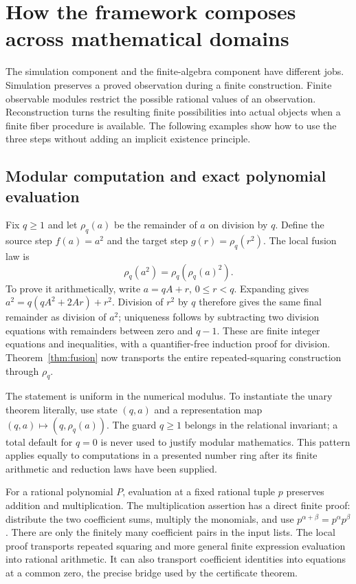 \section{How the framework composes across mathematical domains}
\label{sec:applications}

The simulation component and the finite-algebra component have different
jobs. Simulation preserves a proved observation during a finite
construction. Finite observable modules restrict the possible rational
values of an observation. Reconstruction turns the resulting finite
possibilities into actual objects when a finite fiber procedure is
available. The following examples show how to use the three steps
without adding an implicit existence principle.

\subsection{Modular computation and exact polynomial evaluation}

Fix $q\ge1$ and let $\rho_q(a)$ be the remainder of $a$ on division
by $q$. Define the source step $f(a)=a^2$ and the target step
$g(r)=\rho_q(r^2)$. The local fusion law is
\[
                  \rho_q(a^2)=\rho_q(\rho_q(a)^2).
\]
To prove it arithmetically, write $a=qA+r$, $0\le r<q$.
Expanding gives $a^2=q(qA^2+2Ar)+r^2$. Division of $r^2$ by
$q$ therefore gives the same final remainder as division of $a^2$;
uniqueness follows by subtracting two division equations with remainders
between zero and $q-1$. These are finite integer equations and
inequalities, with a quantifier-free induction proof for division.
Theorem~\ref{thm:fusion} now transports the entire repeated-squaring
construction through $\rho_q$.

The statement is uniform in the numerical modulus. To instantiate the
unary theorem literally, use state $(q,a)$ and a representation map
$(q,a)\mapsto(q,\rho_q(a))$. The guard $q\ge1$ belongs in the
relational invariant; a total default for $q=0$ is never used to
justify modular mathematics. This pattern applies equally to computations
in a presented number ring after its finite arithmetic and reduction
laws have been supplied.

For a rational polynomial $P$, evaluation at a fixed rational tuple
$p$ preserves addition and multiplication. The multiplication assertion
has a direct finite proof: distribute the two coefficient sums, multiply
the monomials, and use $p^{\alpha+\beta}=p^\alpha p^\beta$.
There are only the finitely many coefficient pairs in the input lists.
The local proof transports repeated squaring and more general finite
expression evaluation into rational arithmetic. It can also transport
coefficient identities into equations at a common zero, the precise
bridge used by the certificate theorem.

